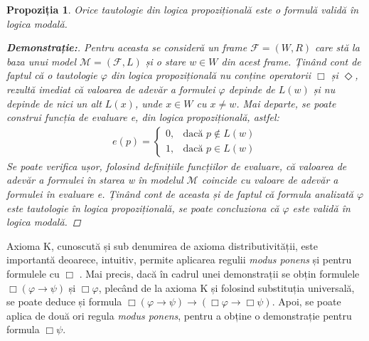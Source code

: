 \documentclass[12pt, openany]{book}
\newtheorem{sentence}[definition]{Propoziția} %
\newcommand{\mytwobranchesfunction}[4]{
	\left\{
		\begin{array}{ll}
			#1 ,& \mbox{dacă } #2 \\
			#3 ,& \mbox{dacă } #4
		\end{array}
	\right.
}
\begin{document}
            \begin{sentence}
                Orice tautologie din logica propozițională este o formulă validă în logica modală.
                
                \begin{proof}[\textbf{Demonstrație:}]
                    Pentru aceasta se consideră un \textit{frame} $\mathcal{F}=(W,R)$ care stă la baza unui model 
                    $\mathcal{M}=(\mathcal{F},L)$ și o stare $w \in W$ din acest \textit{frame}. Ținând cont de faptul că o 
                    tautologie $\varphi$ din logica propozițională nu conține operatorii $\Box$ și $\Diamond$, rezultă 
                    imediat că valoarea de adevăr a formulei $\varphi$ depinde de $L(w)$ și nu depinde de nici un alt 
                    $L(x)$, unde $x \in W$ cu $x \neq w$. Mai departe, se poate construi funcția de evaluare e, din logica 
                    propozițională, astfel:
                    \begin{align*}
                        e(p) = \mytwobranchesfunction {0} {p \notin L(w)} {1} {p \in L(w)}
                    \end{align*}
                    Se poate verifica ușor, folosind definițiile funcțiilor de evaluare, că valoarea de adevăr a formulei în
                    starea w în modelul $\mathcal{M}$ coincide cu valoare de adevăr a formulei în evaluare e. Ținând cont de
                    aceasta și de faptul că formula analizată $\varphi$ este tautologie în logica propozițională, se poate 
                    concluziona că $\varphi$ este validă în logica modală.
                \end{proof}
            \end{sentence}
            
            \par{}
                Axioma K, cunoscută și sub denumirea de axioma distributivității, este importantă deoarece, intuitiv, 
                permite aplicarea regulii \textit{modus ponens} și pentru formulele cu $\Box$ \cite{modal_logic}. Mai precis,
                dacă în cadrul unei demonstrații se obțin formulele $\Box (\varphi \rightarrow \psi)$ și $\Box \varphi$, 
                plecând de la axioma K și folosind substituția universală, se poate deduce și formula $\Box (\varphi 
                \rightarrow \psi) \rightarrow (\Box \varphi \rightarrow \Box \psi)$. Apoi, se poate aplica de două ori 
                regula \textit{modus ponens}, pentru a obține o demonstrație pentru formula $\Box \psi$.
\end{document}
